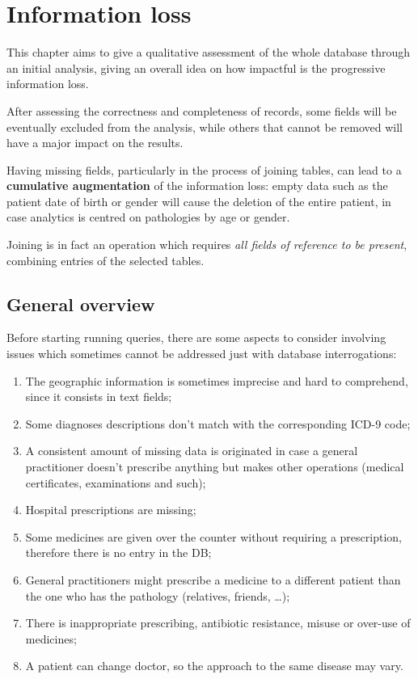 \chapter{Information loss} 
This chapter aims to give a qualitative assessment of the whole database through an initial analysis, giving an overall idea on how impactful is the progressive information loss. 

After assessing the correctness and completeness of records, some fields will be eventually excluded from the analysis, while others that cannot be removed will have a major impact on the results.

Having missing fields, particularly in the process of joining tables, can lead to a \textbf{cumulative augmentation} of the information loss: empty data such as the patient date of birth or gender will cause the deletion of the entire patient, in case analytics is centred on pathologies by age or gender.

Joining is in fact an operation which requires \textit{all fields of reference to be present}, combining entries of the selected tables.

\section{General overview}
Before starting running queries, there are some aspects to consider involving issues which sometimes cannot be addressed just with database interrogations:
\begin{enumerate}
	\item The geographic information is sometimes imprecise and hard to comprehend, since it consists in text fields;
	\item Some diagnoses descriptions don't match with the corresponding ICD-9 code;
	\item A consistent amount of missing data is originated in case a general practitioner doesn't prescribe anything but makes other operations (medical certificates, examinations and such);
	\item Hospital prescriptions are missing;
	\item Some medicines are given over the counter without requiring a prescription, therefore there is no entry in the DB;
	\item General practitioners might prescribe a medicine to a different patient than the one who has the pathology (relatives, friends, \dots);
	\item There is inappropriate prescribing, antibiotic resistance, misuse or over-use of medicines;
	\item A patient can change doctor, so the approach to the same disease may vary.
\end{enumerate}

